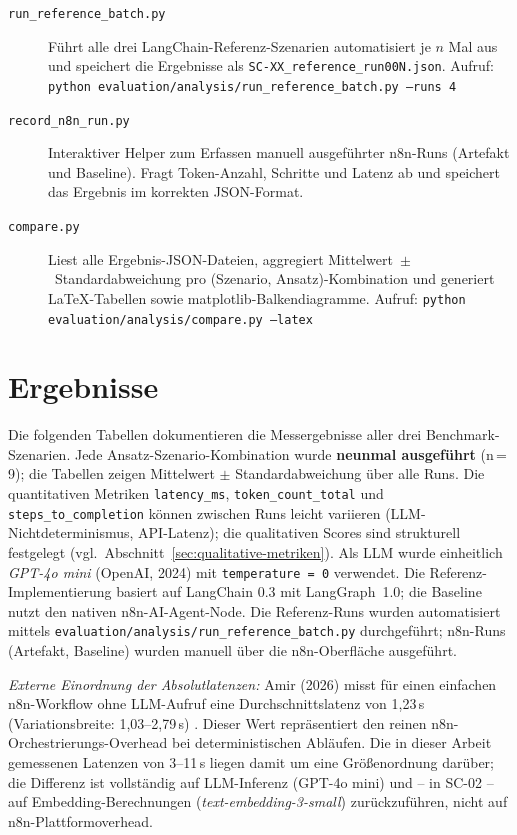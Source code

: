 \documentclass[12pt,a4paper,oneside]{report}
\begin{document}
\begin{description}
  \item[\texttt{run\_reference\_batch.py}] Führt alle drei LangChain-Referenz-Szenarien
    automatisiert je $n$ Mal aus und speichert die Ergebnisse als
    \texttt{SC-XX\_reference\_run00N.json}. Aufruf:
    \texttt{python evaluation/analysis/run\_reference\_batch.py --runs 4}

  \item[\texttt{record\_n8n\_run.py}] Interaktiver Helper zum Erfassen manuell
    ausgeführter n8n-Runs (Artefakt und Baseline). Fragt Token-Anzahl, Schritte und
    Latenz ab und speichert das Ergebnis im korrekten JSON-Format.

  \item[\texttt{compare.py}] Liest alle Ergebnis-JSON-Dateien, aggregiert
    Mittelwert~$\pm$~Standardabweichung pro (Szenario, Ansatz)-Kombination und
    generiert \LaTeX-Tabellen sowie matplotlib-Balkendiagramme. Aufruf:
    \texttt{python evaluation/analysis/compare.py --latex}
\end{description}

\section{Ergebnisse}

Die folgenden Tabellen dokumentieren die Messergebnisse aller drei Benchmark-Szenarien.
Jede Ansatz-Szenario-Kombination wurde \textbf{neunmal ausgeführt} (n\,=\,9); die Tabellen
zeigen Mittelwert $\pm$ Standardabweichung über alle Runs. Die quantitativen Metriken
\texttt{latency\_ms}, \texttt{token\_count\_total} und \texttt{steps\_to\_completion}
können zwischen Runs leicht variieren (LLM-Nichtdeterminismus, API-Latenz); die
qualitativen Scores sind strukturell festgelegt (vgl.\ Abschnitt~\ref{sec:qualitative-metriken}).
Als \ac{LLM} wurde einheitlich \textit{GPT-4o mini} (OpenAI, 2024) mit
\texttt{temperature\,=\,0} verwendet. Die Referenz-Implementierung basiert
auf LangChain 0.3 mit LangGraph~1.0; die Baseline nutzt den nativen n8n-AI-Agent-Node.
Die Referenz-Runs wurden automatisiert mittels
\texttt{evaluation/analysis/run\_reference\_batch.py} durchgeführt;
n8n-Runs (Artefakt, Baseline) wurden manuell über die n8n-Oberfläche ausgeführt.

\noindent\textit{Externe Einordnung der Absolutlatenzen:}
Amir (2026) misst für einen einfachen n8n-Workflow ohne LLM-Aufruf eine
Durchschnittslatenz von 1{,}23\,s (Variationsbreite: 1{,}03--2{,}79\,s)
\cite{amir2026evaluating}. Dieser Wert repräsentiert den reinen
n8n-Orchestrierungs-Overhead bei deterministischen Abläufen. Die in
dieser Arbeit gemessenen Latenzen von 3--11\,s liegen damit um eine
Größenordnung darüber; die Differenz ist vollständig auf LLM-Inferenz
(GPT-4o mini) und -- in SC-02 -- auf Embedding-Berechnungen
(\textit{text-embedding-3-small}) zurückzuführen, nicht auf
n8n-Plattformoverhead.
\end{document}
